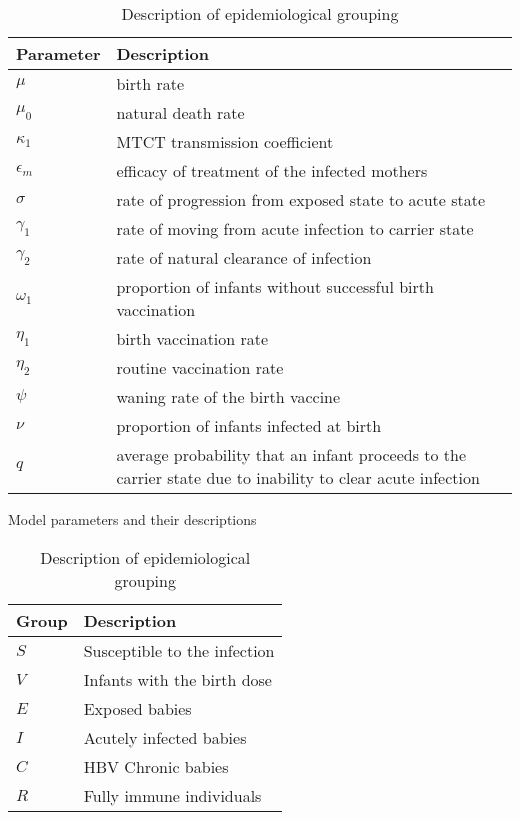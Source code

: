 \vspace{1cm}
\begin{table}[t]
	\centering
	\begin{tabular}{ |p{1.57cm}|p{12cm}| }
		\hline
		Parameter& Description \\
		\hline
		$	\mu		$    	& 	birth rate    \\
		$	\mu_0 $			&  	natural death rate   \\
		$\kappa_1$ 			& 	MTCT transmission coefficient\\
		$\epsilon_m$ 		& 	efficacy of treatment of the infected mothers\\
		$\sigma$ 			& 	rate of progression from exposed state to acute state\\
		$\gamma_1$			& 	rate of moving from acute infection to carrier state\\
		$\gamma_2$ 			& 	rate of natural clearance of infection\\
		$\omega_1$			& 	proportion of infants without successful birth vaccination\\
		$\eta_1$ 			& 	birth vaccination rate\\
		$\eta_2$ 			&	routine vaccination rate\\
		$\psi$				&	waning rate of the birth vaccine\\
		$\nu$ 				& 	proportion of infants infected at birth\\
		$q$ 				& 	average probability that an infant proceeds to the carrier state due to inability to clear acute infection\\
		\hline
	\end{tabular}
	\caption{Model parameters and their descriptions}
	\label{table:1}
	
	
		\centering
		\begin{tabular}{ |p{1.57cm}|p{12cm}| }
			\hline
			Group & Description \\
			\hline
			$	S		$    		& 		Susceptible to the infection    \\
			$	V 		$			&  	 	Infants with the birth dose  	\\
			$	E 		$			&  	 	Exposed babies  				\\
			$	I 		$			&  	 	Acutely infected babies   		\\
			$	C       $ 			& 		HBV Chronic babies				\\
			$	R		$ 			& 		Fully immune individuals		\\
			\hline
		\end{tabular}
		\caption{Description of epidemiological grouping}
		\label{table:2}
		\vspace{1mm}
\end{table}
